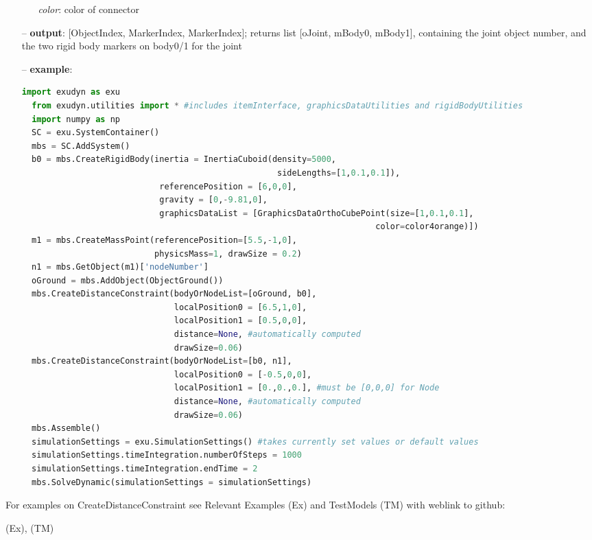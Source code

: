 \begin{itemize}[leftmargin=0.7cm]
\begin{itemize}[leftmargin=1.2cm]
\item[]{\it color}: color of connector
\end{itemize}
\item[--]
{\bf output}: [ObjectIndex, MarkerIndex, MarkerIndex]; returns list [oJoint, mBody0, mBody1], containing the joint object number, and the two rigid body markers on body0/1 for the joint
\item[--]
{\bf example}: \vspace{-12pt}\ei\begin{lstlisting}[language=Python, xleftmargin=36pt]
  import exudyn as exu
  from exudyn.utilities import * #includes itemInterface, graphicsDataUtilities and rigidBodyUtilities
  import numpy as np
  SC = exu.SystemContainer()
  mbs = SC.AddSystem()
  b0 = mbs.CreateRigidBody(inertia = InertiaCuboid(density=5000,
                                                    sideLengths=[1,0.1,0.1]),
                            referencePosition = [6,0,0],
                            gravity = [0,-9.81,0],
                            graphicsDataList = [GraphicsDataOrthoCubePoint(size=[1,0.1,0.1],
                                                                        color=color4orange)])
  m1 = mbs.CreateMassPoint(referencePosition=[5.5,-1,0],
                           physicsMass=1, drawSize = 0.2)
  n1 = mbs.GetObject(m1)['nodeNumber']
  oGround = mbs.AddObject(ObjectGround())
  mbs.CreateDistanceConstraint(bodyOrNodeList=[oGround, b0],
                               localPosition0 = [6.5,1,0],
                               localPosition1 = [0.5,0,0],
                               distance=None, #automatically computed
                               drawSize=0.06)
  mbs.CreateDistanceConstraint(bodyOrNodeList=[b0, n1],
                               localPosition0 = [-0.5,0,0],
                               localPosition1 = [0.,0.,0.], #must be [0,0,0] for Node
                               distance=None, #automatically computed
                               drawSize=0.06)
  mbs.Assemble()
  simulationSettings = exu.SimulationSettings() #takes currently set values or default values
  simulationSettings.timeIntegration.numberOfSteps = 1000
  simulationSettings.timeIntegration.endTime = 2
  mbs.SolveDynamic(simulationSettings = simulationSettings)
\end{lstlisting}\vspace{-24pt}\bi\item[]\vspace{-24pt}\vspace{12pt}\end{itemize}
%

%
\noindent For examples on CreateDistanceConstraint see Relevant Examples (Ex) and TestModels (TM) with weblink to github:
\bi
 \item \footnotesize {} (Ex), 
 (TM)
\ei

%
